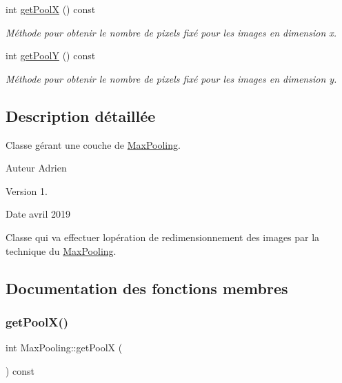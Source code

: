 \begin{DoxyCompactItemize}
int \hyperlink{classMaxPooling_aa794b6174d54f2be8e6eed4ab09365e9}{get\+PoolX} () const
\begin{DoxyCompactList}\small\item\em Méthode pour obtenir le nombre de pixels fixé pour les images en dimension x. \end{DoxyCompactList}\item 
int \hyperlink{classMaxPooling_a7c72e57c8a90e18804b288f28fde7af0}{get\+PoolY} () const
\begin{DoxyCompactList}\small\item\em Méthode pour obtenir le nombre de pixels fixé pour les images en dimension y. \end{DoxyCompactList}\end{DoxyCompactItemize}


\subsection{Description détaillée}
Classe gérant une couche de \hyperlink{classMaxPooling}{Max\+Pooling}. 

\begin{DoxyAuthor}{Auteur}
Adrien 
\end{DoxyAuthor}
\begin{DoxyVersion}{Version}
1. 
\end{DoxyVersion}
\begin{DoxyDate}{Date}
avril 2019
\end{DoxyDate}
Classe qui va effectuer l\textquotesingle{}opération de redimensionnement des images par la technique du \hyperlink{classMaxPooling}{Max\+Pooling}. 

\subsection{Documentation des fonctions membres}
\mbox{\label{classMaxPooling_aa794b6174d54f2be8e6eed4ab09365e9}} 
\subsubsection{\texorpdfstring{get\+Pool\+X()}{getPoolX()}}
{\footnotesize\ttfamily int Max\+Pooling\+::get\+PoolX (\begin{DoxyParamCaption}{ }\end{DoxyParamCaption}) const}



